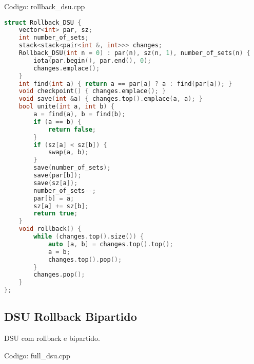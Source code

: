 \documentclass[10pt, a4paper, oneside]{book}
\begin{document}
\hfill

Codigo: rollback\_dsu.cpp

\begin{lstlisting}[language=C++]
struct Rollback_DSU {
    vector<int> par, sz;
    int number_of_sets;
    stack<stack<pair<int &, int>>> changes;
    Rollback_DSU(int n = 0) : par(n), sz(n, 1), number_of_sets(n) {
        iota(par.begin(), par.end(), 0);
        changes.emplace();
    }
    int find(int a) { return a == par[a] ? a : find(par[a]); }
    void checkpoint() { changes.emplace(); }
    void save(int &a) { changes.top().emplace(a, a); }
    bool unite(int a, int b) {
        a = find(a), b = find(b);
        if (a == b) {
            return false;
        }
        if (sz[a] < sz[b]) {
            swap(a, b);
        }
        save(number_of_sets);
        save(par[b]);
        save(sz[a]);
        number_of_sets--;
        par[b] = a;
        sz[a] += sz[b];
        return true;
    }
    void rollback() {
        while (changes.top().size()) {
            auto [a, b] = changes.top().top();
            a = b;
            changes.top().pop();
        }
        changes.pop();
    }
};\end{lstlisting}
\hfill

\subsection{DSU Rollback Bipartido}


DSU com rollback e bipartido.

\hfill

Codigo: full\_dsu.cpp
\end{document}
